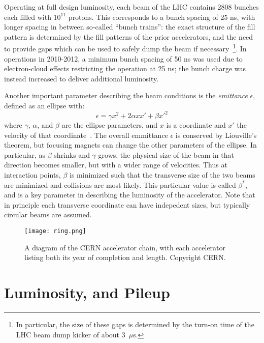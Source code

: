 Operating at full design luminosity, each beam of the LHC contains 2808 bunches each filled with $10^{11}$ protons. This corresponds to a bunch spacing of 25 ns, with longer spacing in between so-called ``bunch trains'': the exact structure of the fill pattern is determined by the fill patterns of the prior accelerators, and the need to provide gaps which can be used to safely dump the beam if necessary~\cite{lhc-bunches}\footnote{In particular, the size of these gaps is determined by the turn-on time of the LHC beam dump kicker of about 3~$\mu$s.}. In operations in 2010-2012, a minimum bunch spacing of 50 ns was used due to electron-cloud effects restricting the operation at 25 ns; the bunch charge was instead increased to deliver additional luminosity. 

Another important parameter describing the beam conditions is the \textit{emittance} $\epsilon$, defined as an ellipse with:
%
\begin{equation}
\epsilon = \gamma x^2 + 2 \alpha x x' + \beta x'^2
\end{equation}
%
where $\gamma$, $\alpha$, and $\beta$ are the ellipse parameters, and $x$ is a coordinate and $x'$ the velocity of that coordinate~\cite{accelerator-book}. The overall emmittance $\epsilon$ is conserved by Liouville's theorem, but focusing magnets can change the other parameters of the ellipse. In particular, as $\beta$ shrinks and $\gamma$ grows, the physical size of the beam in that direction becomes smaller, but with a wider range of velocities. Thus at interaction points, $\beta$ is minimized such that the transverse size of the two beams are minimized and collisions are most likely. This particular value is called $\beta^*$, and is a key parameter in describing the luminosity of the accelerator. Note that in principle each transverse coordinate can have indepedent sizes, but typically circular beams are assumed.


\begin{figure}
\centering
\texttt{[image: ring.png]}
\caption{A diagram of the CERN accelerator chain, with each accelerator listing both its year of completion and length. Copyright CERN.}
\label{fig:lhc:ring}
\end{figure}


\section{Luminosity, and Pileup}
\label{lhc:luminosity-and-pileup}

